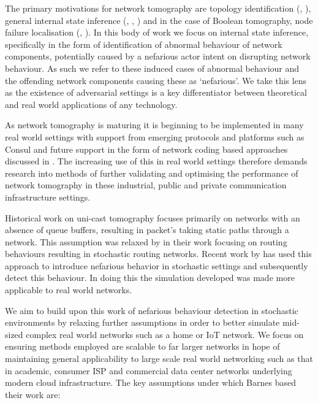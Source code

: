 The primary motivations for network tomography are topology identification (\cite{zhang_topology_2014}, \cite{hailiang_network_2009}), general internal state inference (\cite{vardi_network_1996}, \cite{coates_network_2001}, \cite{he_network_2021}) and in the case of Boolean tomography, node failure localisation (\cite{nguyen_boolean_2007}, \cite{ma_optimal_2015}). In this body of work we focus on internal state inference, specifically in the form of identification of abnormal behaviour of network components, potentially caused by a nefarious actor intent on disrupting network behaviour. As such we refer to these induced cases of abnormal behaviour and the offending network components causing these as ‘nefarious’. We take this lens as the existence of adversarial settings is a key differentiator between theoretical and real world applications of any technology.\par
As network tomography is maturing it is beginning to be implemented in many real world settings with support from emerging protocols and platforms such as Consul \cite{shilton_network_2021} and future support in the form of network coding based approaches discussed in \cite{kakkavas_review_2020}. The increasing use of this in real world settings therefore demands research into methods of further validating and optimising the performance of network tomography in these industrial, public and private  communication infrastructure settings.\par
Historical work on uni-cast tomography focuses primarily on networks with an absence of queue buffers, resulting in packet’s taking static paths through a network. This assumption was relaxed by \cite{lai_measuring_2000} in their work focusing on routing behaviours resulting in stochastic routing networks. Recent work by \cite{barnes_stochastic_2020} has used this approach to introduce nefarious behavior in stochastic settings and subsequently detect this behaviour. In doing this the simulation developed was made more applicable to real world networks.\par
We aim to build upon this work of nefarious behaviour detection in stochastic environments by relaxing further assumptions in order to better simulate mid-sized complex real world networks such as a home or IoT network. We focus on ensuring methods employed are scalable to far larger networks in hope of maintaining general applicability to large scale real world networking such as that in academic, consumer ISP and commercial data center networks underlying modern cloud infrastructure. The key assumptions under which Barnes based their work are:\par
